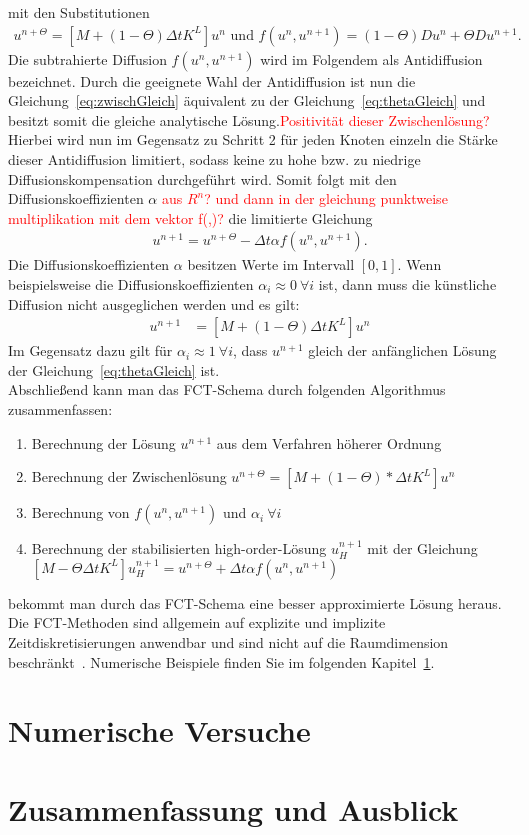 \documentclass[a4paper,11pt]{article}
\newcommand{\col}[2][red]{\textcolor{#1}{#2}}
\begin{document}
mit den Substitutionen
\begin{align}
 u^{n+\Theta}=[M+(1-\Theta)\Delta tK^L]u^n \text{ und } f(u^n,u^{n+1})=(1-\Theta)Du^n+\Theta Du^{n+1}.\nonumber
\end{align}
Die subtrahierte Diffusion $f(u^n,u^{n+1})$ wird im Folgendem als Antidiffusion bezeichnet. Durch die geeignete Wahl der Antidiffusion ist nun die Gleichung~\eqref{eq:zwischGleich} äquivalent zu der Gleichung~\eqref{eq:thetaGleich} und besitzt somit die gleiche analytische Lösung.\col{Positivität dieser Zwischenlösung?} Hierbei wird nun im Gegensatz zu Schritt 2 für jeden Knoten einzeln die Stärke dieser Antidiffusion limitiert, sodass keine zu hohe bzw. zu niedrige Diffusionskompensation durchgeführt wird. Somit folgt mit den Diffusionskoeffizienten $\alpha$ \col{aus $R^n$? und dann in der gleichung punktweise multiplikation mit dem vektor f(,)?} die limitierte Gleichung
\begin{align}
  [M-\Theta\Delta tK^L]u^{n+1}=u^{n+\Theta}-\Delta t\alpha f(u^n,u^{n+1})\label{eq:zwischGleich}.
\end{align}
Die Diffusionskoeffizienten $\alpha$  besitzen Werte im Intervall $[0,1]$. Wenn beispielsweise die Diffusionskoeffizienten $\alpha_i\approx0~\forall i$ ist, dann muss die künstliche Diffusion nicht ausgeglichen werden und es gilt:
\begin{align}
 [M-\Theta\Delta tK^L]u^{n+1}&=[M+(1-\Theta)\Delta tK^L]u^n
\end{align}
Im Gegensatz dazu gilt für $\alpha_i\approx1~\forall i$, dass $u^{n+1}$ gleich der anfänglichen Lösung der Gleichung~\eqref{eq:thetaGleich} ist.\\
Abschließend kann man das FCT-Schema durch folgenden Algorithmus zusammenfassen:
\begin{enumerate}
 \item Berechnung der Lösung $u^{n+1}$ aus dem Verfahren höherer Ordnung
 \item Berechnung der Zwischenlösung $u^{n+\Theta}=[M+(1-\Theta)*\Delta tK^L]u^n$
 \item Berechnung von $f(u^n,u^{n+1})$ und $\alpha_i~\forall i$
 \item Berechnung der stabilisierten high-order-Lösung $u_H^{n+1}$ mit der Gleichung $[M-\Theta\Delta tK^L]u_H^{n+1}=u^{n+\Theta}+\Delta t\alpha f(u^n,u^{n+1})$
\end{enumerate}
 bekommt man durch das FCT-Schema eine besser approximierte Lösung heraus. Die FCT-Methoden sind allgemein auf explizite und implizite Zeitdiskretisierungen anwendbar und sind nicht auf die Raumdimension beschränkt~\cite{kuzmin2002flux}. Numerische Beispiele finden Sie im folgenden Kapitel~\ref{sec:NumVers}.
\pagebreak
\section{Numerische Versuche}\label{sec:NumVers}
\pagebreak
\section{Zusammenfassung und Ausblick}
\pagebreak
{}
\appendix


\end{document}
